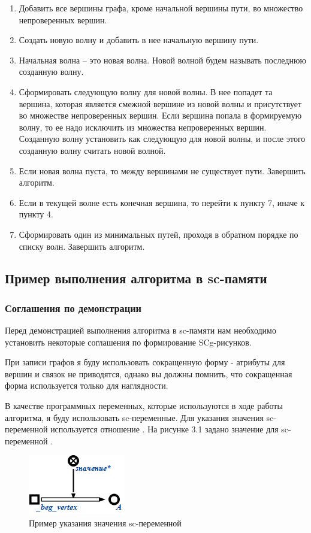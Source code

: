 \begin{enumerate}
\item Добавить все вершины графа, кроме начальной вершины пути, во
  множество непроверенных вершин.
\item Создать новую волну и добавить в нее начальную вершину пути.
\item Начальная волна – это новая волна. Новой волной будем называть
  последнюю созданную волну.
\item Сформировать следующую волну для новой волны. В нее попадет та
  вершина, которая является смежной вершине из новой волны и
  присутствует во множестве непроверенных вершин. Если вершина попала
  в формируемую волну, то ее надо исключить из множества непроверенных
  вершин. Созданную волну установить как следующую для новой волны, и
  после этого созданную волну считать новой волной.
\item Если новая волна пуста, то между вершинами не существует
  пути. Завершить алгоритм.
\item Если в текущей волне есть конечная вершина, то перейти к пункту
  7, иначе к пункту 4.
\item Сформировать один из минимальных путей, проходя в обратном
  порядке по списку волн. Завершить алгоритм.
\end{enumerate}

\subsection{Пример выполнения алгоритма в sc-памяти}

\subsubsection{Соглашения по демонстрации}

Перед демонстрацией выполнения алгоритма в sc-памяти нам необходимо
установить некоторые соглашения по формирование SCg-рисунков.

При записи графов я буду использовать сокращенную форму - атрибуты для
вершин и связок не приводятся, однако вы должны помнить, что
сокращенная форма используется только для наглядности.

В качестве программных переменных, которые используются в ходе работы
алгоритма, я буду использовать sc-переменные. Для указания значения
sc-переменной используется отношение .  На рисунке 3.1
задано значение для sc-переменной .

\begin{figure}[h!]
  \centering
  \includegraphics{images/3/Value_sc_var}
  \caption{Пример указания значения sc-переменной }
  \label{fig:Value_sc_var}
\end{figure}

